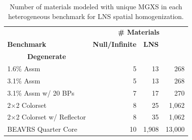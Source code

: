 \begin{table}[h!]
  \centering
  \caption[Number of materials for LNS spatial homogenization]{Number of materials modeled with unique \ac{MGXS} in each heterogeneous benchmark for \ac{LNS} spatial homogenization.}
  \small
  \label{table:chap9-num-materials-lns}
  \vspace{6pt}
  \begin{tabular}{l r r r}
  \toprule
  \rowcolor{lightgray}
  & \multicolumn{3}{c}{\cellcolor{lightgray} \bf \# Materials} \\
  \multirow{-2}{*}{\cellcolor{lightgray} \bf Benchmark} &
  \multicolumn{1}{c}{\cellcolor{lightgray} \bf Null/Infinite} &
  \multicolumn{1}{c}{\cellcolor{lightgray} \bf \ac{LNS}} \\
  \multicolumn{1}{c}{\cellcolor{lightgray} \bf Degenerate} \\
  \midrule
1.6\% Assm & 5 & 13 & 268 \\
  \midrule
3.1\% Assm & 5 & 13 & 268 \\
  \midrule
3.1\% Assm w/ 20 BPs & 7 & 17 & 270  \\
  \midrule
2$\times$2 Colorset & 8 & 25 & 1,062 \\
  \midrule
2$\times$2 Colorset w/ Reflector & 8 & 35 & 1,062 \\
  \midrule
\ac{BEAVRS} Quarter Core & 10 & 1,908 & 13,000 \\ %
  \bottomrule
\end{tabular}
\end{table}


